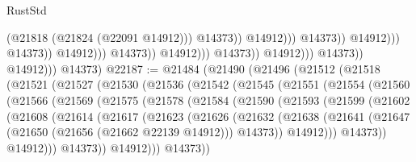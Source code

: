 \begin{lexlean}{RustStd}
\begin{coremodule}
                                                                  (@21818 (@21824 (@22091 @14912)))
                                                                  @14373))
                                                              @14912)))
                                                        @14373))
                                                    @14912)))
                                              @14373))
                                          @14912)))
                                    @14373))
                                @14912)))
                          @14373))
                      @14912)))
                @14373))
            @14912)))
      @14373)
@22187 := @21484
    (@21490
      (@21496
        (@21512
          (@21518
            (@21521
              (@21527
                (@21530
                  (@21536
                    (@21542
                      (@21545
                        (@21551
                          (@21554
                            (@21560
                              (@21566
                                (@21569
                                  (@21575
                                    (@21578
                                      (@21584
                                        (@21590
                                          (@21593
                                            (@21599
                                              (@21602
                                                (@21608
                                                  (@21614
                                                    (@21617
                                                      (@21623
                                                        (@21626
                                                          (@21632
                                                            (@21638
                                                              (@21641
                                                                (@21647
                                                                  (@21650
                                                                    (@21656 (@21662 @22139 @14912)))
                                                                  @14373))
                                                              @14912)))
                                                        @14373))
                                                    @14912)))
                                              @14373))
                                          @14912)))
                                    @14373))

\end{coremodule}
\end{lexlean}
